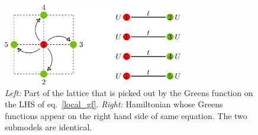 \documentclass[12pt]{article}
\numberwithin{equation}{section}
\begin{document}
\begin{figure}[htpb!]
	\centering
	\hspace*{\fill}
	\includegraphics[width=0.7\textwidth]{./lattice.png}
	\hspace*{\fill}
	\caption{\textit{Left:} Part of the lattice that is picked out by the Greens function on the LHS of eq.~\ref{local_gf}. \textit{Right:} Hamiltonian whose Greens functions appear on the right hand side of same equation. The two submodels are identical.}
\end{figure}
\end{document}
